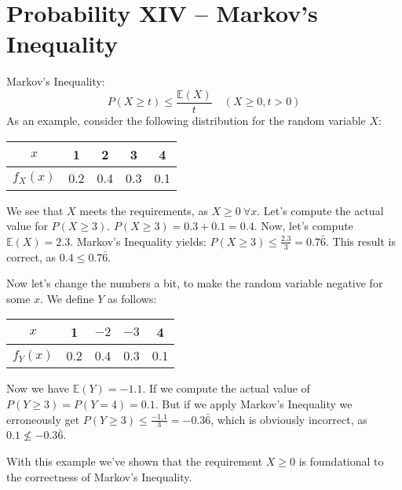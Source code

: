 \documentclass{article}
\begin{document}
\section{Probability XIV -- Markov's Inequality}
Markov's Inequality: \[P(X \geq t) \leq \dfrac{\mathbb E(X)}{t} \quad (X \geq 0, t > 0)\]
As an example, consider the following distribution for the random variable $X$: 
\begin{table}[H]
    \centering
    \begin{tabular}{c|cccc}
         $x$ & 1 & 2 & 3 & 4 \\
         \hline
         $f_X(x)$ & 0.2 & 0.4 & 0.3 & 0.1
    \end{tabular}
\end{table}
We see that $X$ meets the requirements, as $X \geq 0 \ \forall x$.
Let's compute the actual value for $P(X \geq 3)$. $P(X \geq 3) = 0.3 + 0.1 = 0.4$. Now, let's compute $\mathbb E(X) = 2.3$.
Markov's Inequality yields: $P(X \geq 3) \leq \frac{2.3}{3} = 0.7\bar 6$. This result is correct, as $0.4 \leq 0.7\bar 6$.

Now let's change the numbers a bit, to make the random variable negative for some $x$. 
We define $Y$ as follows: 
\begin{table}[H]
    \centering
    \begin{tabular}{c|cccc}
         $x$ & 1 & $-2$ & $-3$ & 4 \\
         \hline
         $f_Y(x)$ & 0.2 & 0.4 & 0.3 & 0.1
    \end{tabular}
\end{table}
Now we have $\mathbb E(Y) = -1.1$. If we compute the actual value of $P(Y \geq 3) = P(Y = 4) = 0.1$. But if we apply Markov's Inequality we erroneously get $P(Y \geq 3) \leq \frac{-1.1}{3} = -0.3\bar 6$, which is obviously incorrect, as $0.1 \not\leq -0.3\bar6$.

With this example we've shown that the requirement $X \geq 0$ is foundational to the correctness of Markov's Inequality. 
\end{document}
